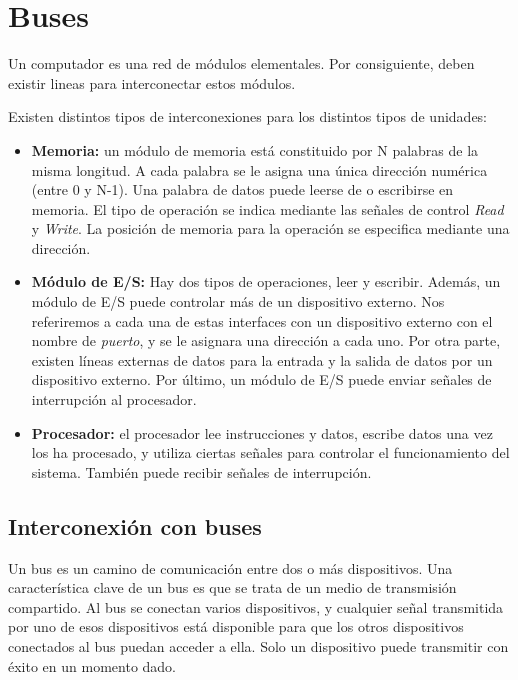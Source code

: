 \section{Buses}\label{sec:buses}

Un computador es una red de módulos elementales. Por consiguiente, deben existir lineas para interconectar estos módulos.

Existen distintos tipos de interconexiones para los distintos tipos de unidades:

\begin{itemize}
  \item \textbf{Memoria:} un módulo de memoria está constituido por N palabras de la misma longitud. A cada palabra se le asigna una única dirección numérica (entre 0 y N-1). Una palabra de datos puede leerse de o escribirse en memoria. El tipo de operación se indica mediante las señales de control \textit{Read} y \textit{Write}. La posición de memoria para la operación se especifica mediante una dirección.
  \item \textbf{Módulo de E/S:} Hay dos tipos de operaciones, leer y escribir. Además, un módulo de E/S puede controlar más de un dispositivo externo. Nos referiremos a cada una de estas interfaces con un dispositivo externo con el nombre de \textit{puerto}, y se le asignara una dirección a cada uno. Por otra parte, existen líneas externas de datos para la entrada y la salida de datos por un dispositivo externo. Por último, un módulo de E/S puede enviar señales de interrupción al procesador.
  \item\textbf{Procesador:} el procesador lee instrucciones y datos, escribe datos una vez los ha procesado, y utiliza ciertas señales para controlar el funcionamiento del sistema. También puede recibir señales de interrupción.
\end{itemize}

\subsection{Interconexión con buses}

Un bus es un camino de comunicación entre dos o más dispositivos. Una característica clave de un bus es que se trata de un medio de transmisión compartido. Al bus se conectan varios dispositivos, y cualquier señal transmitida por uno de esos dispositivos está disponible para que los otros dispositivos conectados al bus puedan acceder a ella. Solo un dispositivo puede transmitir con éxito en un momento dado.

